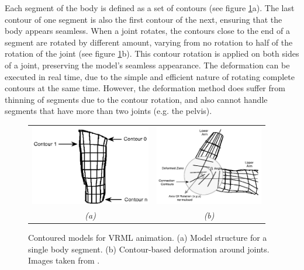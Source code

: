 \documentclass[10pt,oneside,fleqn,a4paper]{book}
\begin{document}
Each segment of the body is defined as a set of contours (see figure \ref{fig:babskimodels}a). The last contour of one segment is also the first contour of the next, ensuring that the body appears seamless. When a joint rotates, the contours close to the end of a segment are rotated by different amount, varying from no rotation to half of the rotation of the joint (see figure \ref{fig:babskimodels}b). This contour rotation is applied on both sides of a joint, preserving the model's seamless appearance. The deformation can be executed in real time, due to the simple and efficient nature of rotating complete contours at the same time. However, the deformation method does suffer from thinning of segments due to the contour rotation, and also cannot handle segments that have more than two joints (e.g. the pelvis).

\begin{figure}
\begin{center}
\begin{tabular}{cc}
\includegraphics[height=3.5cm]{../images/babski_contours} &
\includegraphics[height=3.5cm]{../images/babski_deformation} \\
{\it(a)} & {\it(b)}
\end{tabular}
\caption[Contoured models for VRML animation]{\label{fig:babskimodels}Contoured models for VRML animation. (a) Model structure for a single body segment. (b) Contour-based deformation around joints. Images taken from \cite{Babski99}.}
\end{center}
\end{figure}

\end{document}
